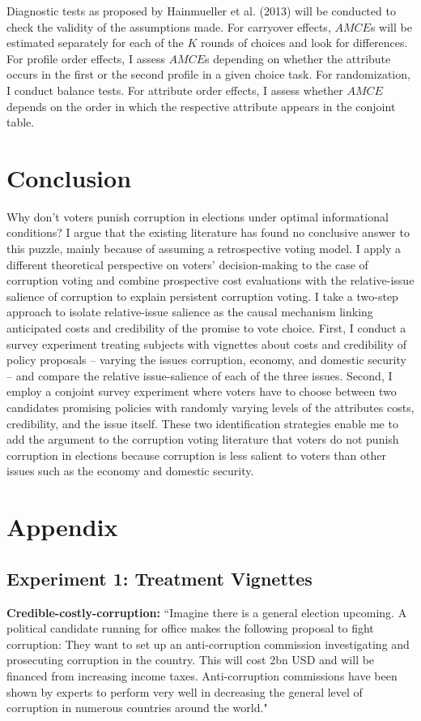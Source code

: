 \documentclass[11pt]{article}
\begin{document}
Diagnostic tests as proposed by Hainmueller et al. (2013) will be conducted to check the validity of the assumptions made. For carryover effects, $AMCE$s will be estimated separately for each of the $K$ rounds of choices and look for differences. For profile order effects, I assess $AMCE$s depending on whether the attribute occurs in the first or the second profile in a given choice task. For randomization, I conduct balance tests. For attribute order effects, I assess whether $AMCE$ depends on the order in which the respective attribute appears in the conjoint table.

\newpage
\section{Conclusion}
Why don't voters punish corruption in elections under optimal informational conditions? I argue that the existing literature has found no conclusive answer to this puzzle, mainly because of assuming a retrospective voting model. I apply a different theoretical perspective on voters' decision-making to the case of corruption voting and combine prospective cost evaluations with the relative-issue salience of corruption to explain persistent corruption voting. I take a two-step approach to isolate relative-issue salience as the causal mechanism linking anticipated costs and credibility of the promise to vote choice. First, I conduct a survey experiment treating subjects with vignettes about costs and credibility of policy proposals -- varying the issues corruption, economy, and domestic security -- and compare the relative issue-salience of each of the three issues. Second, I employ a conjoint survey experiment where voters have to choose between two candidates promising policies with randomly varying levels of the attributes costs, credibility, and the issue itself. These two identification strategies enable me to add the argument to the corruption voting literature that voters do not punish corruption in elections because corruption is less salient to voters than other issues such as the economy and domestic security.

\newpage
\section{Appendix}
\subsection{Experiment 1: Treatment Vignettes} \label{sec:sec1}
\textbf{Credible-costly-corruption:}
“Imagine there is a general election upcoming. A political candidate running for office makes the following proposal to fight corruption: They want to set up an anti-corruption commission investigating and prosecuting corruption in the country. This will cost 2bn USD and will be financed from increasing income taxes. Anti-corruption commissions have been shown by experts to perform very well in decreasing the general level of corruption in numerous countries around the world."
\end{document}
